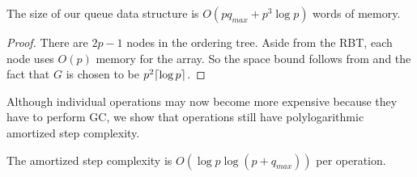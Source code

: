 \begin{theorem}\label{spaceBound}
The size of our queue data structure is $O(pq_{max}+p^3\log p)$ words of memory.
\end{theorem}
\begin{proof}
There are $2p-1$ nodes in the ordering tree.  Aside from the RBT, each node uses $O(p)$ memory for the
 array.  So the space bound follows from  and the fact that $G$ is chosen
to be $p^2\lceil \log p \rceil$.
\end{proof}

Although individual operations may now become more expensive because they have to perform GC,
we show that operations still have polylogarithmic amortized step complexity.

\begin{proposition}
The amortized step complexity is $O(\log p \log(p+q_{max}))$ per operation.
\end{proposition}
